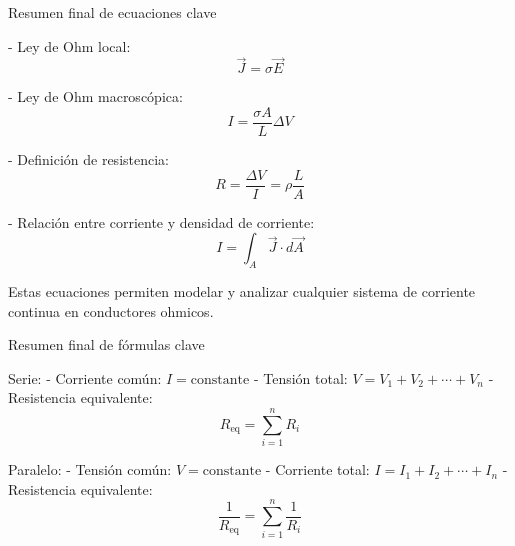 Resumen final de ecuaciones clave

- Ley de Ohm local:  
\[
\vec{J} = \sigma \vec{E}
\]

- Ley de Ohm macroscópica:  
\[
I = \frac{\sigma A}{L} \Delta V
\]

- Definición de resistencia:  
\[
R = \frac{\Delta V}{I} = \rho \frac{L}{A}
\]

- Relación entre corriente y densidad de corriente:  
\[
I = \int_A \vec{J} \cdot d\vec{A}
\]

Estas ecuaciones permiten modelar y analizar cualquier sistema de corriente continua en conductores ohmicos.



Resumen final de fórmulas clave

Serie:
- Corriente común: \( I = \text{constante} \)
- Tensión total: \( V = V_1 + V_2 + \cdots + V_n \)
- Resistencia equivalente:  
\[
\boxed{R_{\text{eq}} = \sum_{i=1}^{n} R_i}
\]

Paralelo:
- Tensión común: \( V = \text{constante} \)
- Corriente total: \( I = I_1 + I_2 + \cdots + I_n \)
- Resistencia equivalente:  
\[
\boxed{\frac{1}{R_{\text{eq}}} = \sum_{i=1}^{n} \frac{1}{R_i}}
\]

